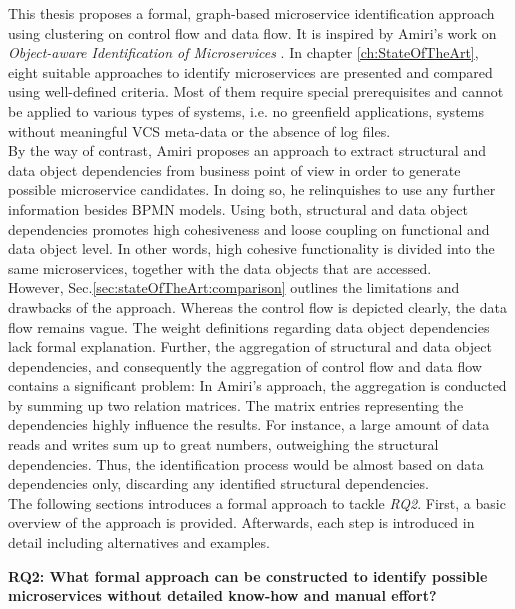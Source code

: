 \noindent
This thesis proposes a formal, graph-based microservice identification approach using clustering on control flow and data flow. It is  inspired by Amiri’s work on \textit{Object-aware Identification of Microservices} \cite{ObjectAwareAmiri}. In chapter \ref{ch:StateOfTheArt}, eight suitable approaches to identify microservices are presented and compared using well-defined criteria. Most of them require special prerequisites and cannot be applied to various types of systems, i.e. no greenfield applications, systems without meaningful VCS meta-data or the absence of log files.
\\
By the way of contrast, Amiri proposes an approach to extract structural and data object dependencies from business point of view in order to generate possible microservice candidates. In doing so, he relinquishes to use any further information besides BPMN models. Using both, structural and data object dependencies promotes high cohesiveness and loose coupling on functional and data object level. In other words, high cohesive functionality is divided into the same microservices, together with the data objects that are accessed. \\
However, Sec.\ref{sec:stateOfTheArt:comparison} outlines the limitations and drawbacks of the approach. Whereas the control flow is depicted clearly, the data flow remains vague. The weight definitions regarding data object dependencies lack formal explanation. Further, the aggregation of structural and data object dependencies, and consequently the aggregation of control flow and data flow contains a significant problem: In Amiri's approach, the aggregation is conducted by summing up two relation matrices. The matrix entries representing the dependencies highly influence the results. For instance, a large amount of data reads and writes sum up to great numbers, outweighing the structural dependencies. Thus, the identification process would be almost based on data dependencies only, discarding any identified structural dependencies. \\
The following sections introduces a formal approach to tackle \textit{RQ2}. First, a basic overview of the approach is provided. Afterwards, each step is introduced in detail including alternatives and examples. 




\vspace{0.5cm}
\par
\begingroup
\leftskip=1cm
\rightskip=1cm

\noindent
\textbf{RQ2: What formal approach can be constructed to identify possible microservices without detailed know-how and manual effort? }

